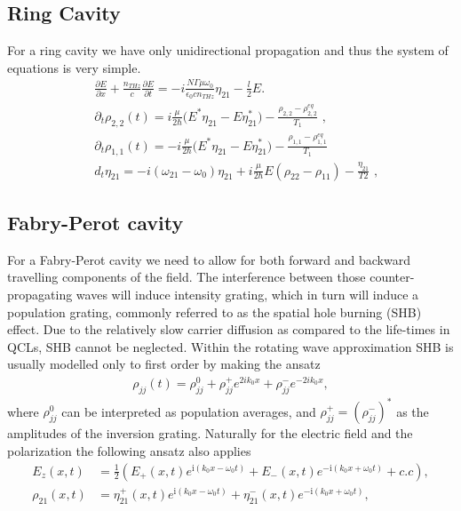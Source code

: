 \documentclass[preprint,secnumarabic,amssymb, nobibnotes, aip, prd]{revtex4-1}
\def\p{\partial}
\begin{document}
\subsection{Ring Cavity}
For a ring cavity we have only unidirectional propagation and thus the system of equations is very simple.  
\begin{align}
& \frac{\p E}{\p x}+ \frac{n_{THz}}{c} \frac{\p E}{\p t} = -i\frac{N\Gamma\mu\omega_0}{\epsilon_0 c n_{THz}}\eta_{21}-\frac{l}{2}E.
\\
& \partial_t {\rho_{2,2}(t)} = i\frac{ \mu }{2 \hbar} \Big ( E^* \eta_{21} - E\eta_{21}^* \Big) -\frac{\rho_{2,2}-\rho_{2,2}^{eq}}{T_1}\text{  ,}
\\
& \partial_t {\rho_{1,1}(t)} = - i\frac{ \mu }{2 \hbar} \Big ( E^* \eta_{21} - E\eta_{21}^* \Big) -\frac{\rho_{1,1}-\rho_{1,1}^{eq}}{T_1}
\\
& d_t \eta_{21} = -i(\omega_{21}-\omega_0)\eta_{21}+i\frac{ \mu}{ 2 \hbar} E(\rho_{22}-\rho_{11}) - \frac{\eta_{21}}{T2} \text{  ,}
\end{align}

\subsection{Fabry-Perot cavity}

For a Fabry-Perot cavity we need to allow for both forward and backward travelling components of the field. The interference between those counter-propagating waves will induce intensity grating, which in turn will induce a population grating, commonly referred to as the spatial hole burning (SHB) effect. Due to the relatively slow carrier diffusion as compared to the life-times in QCLs, SHB cannot be neglected. Within the rotating wave approximation SHB is usually modelled only to first order by making the ansatz 
\begin{align}
\rho_{jj}(t) = \rho_{jj}^{0} + \rho_{jj}^{+}e^{2ik_0x}+\rho_{jj}^{-}e^{-2ik_0x}, 
\end{align}
where $\rho_{jj}^{0}$ can be interpreted as population averages, and $\rho_{jj}^{+}=(\rho_{jj}^{-})^{\ast}$ as the amplitudes of the inversion grating. Naturally for the electric field and the polarization the following ansatz also applies 
\begin{align}
E_{z}(x,t) &=\frac{1}{2}\left( E_{+}(x,t)e^{\mathrm{i}(k_{0}x-\omega_{0}t)} +E_{-}(x,t)e^{-\mathrm{i}(k_{0}x+\omega_{0}t)}  +c.c\right)  , \label{eq:e-ansatz} \\
\rho_{21}(x,t)  &  =\eta_{21}^{+}(x,t)e^{  \mathrm{i}(k_{0}x-\omega_{0}t)}  +\eta_{21}^{-}(x,t)e^{-\mathrm{i}(k_{0}x+\omega_{0}t)}  ,\label{eq:21ansatz}
\end{align}
\end{document}
